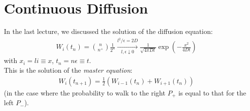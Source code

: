 \documentclass[../template.tex]{subfiles}
\begin{document}
\section{Continuous Diffusion}
In the last lecture, we discussed the solution of the diffusion equation:
\begin{align*}
    W_i(t_n) = {n\choose n^+} \frac{1}{2^n}  \xrightarrow[l, \epsilon \downarrow 0]{l^2/\epsilon = 2D} \frac{1}{\sqrt{4 \pi D t}}\exp\left(-\frac{x^2}{4Dt} \right)     
\end{align*}
with $x_i = l i \equiv x$, $t_n = n \epsilon \equiv t$.\\
This is the solution of the \textit{master equation}:
\begin{align*}
    W_i(t_{n+1}) = \frac{1}{2}  (W_{i-1}(t_n) + W_{i+1}(t_n))
\end{align*}  
(in the case where the probability to walk to the right $P_+$ is equal to that for the left $P_-$).\\
\end{document}
